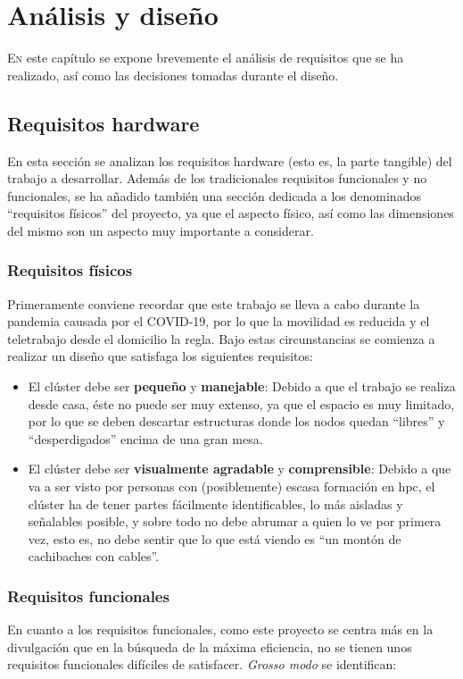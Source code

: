 \chapter{Análisis y diseño}
\label{chap:analisis_diseño}

\lettrine{E}{n} este capítulo se expone brevemente el análisis de requisitos que se ha realizado, así como las decisiones tomadas durante el diseño.

\section{Requisitos hardware}
\label{sec:requisitos_hardware}
En esta sección se analizan los requisitos hardware (esto es, la parte tangible) del trabajo a desarrollar. Además de los tradicionales requisitos funcionales y no funcionales, se ha añadido también una sección dedicada a los denominados ``requisitos físicos'' del proyecto, ya que el aspecto físico, así como las dimensiones del mismo son un aspecto muy importante a considerar.

\subsection{Requisitos físicos}
Primeramente conviene recordar que este trabajo se lleva a cabo durante la pandemia causada por el COVID-19, por lo que la movilidad es reducida y el teletrabajo desde el domicilio la regla. Bajo estas circunstancias se comienza a realizar un diseño que satisfaga los siguientes requisitos:
\begin{itemize}
    \item El clúster debe ser \textbf{pequeño} y \textbf{manejable}: Debido a que el trabajo se realiza desde casa, éste no puede ser muy extenso, ya que el espacio es muy limitado, por lo que se deben descartar estructuras donde los nodos quedan ``libres'' y ``desperdigados'' encima de una gran mesa.
    \item El clúster debe ser \textbf{visualmente agradable} y \textbf{comprensible}: Debido a que va a ser visto por personas con (posiblemente) escasa formación en \acrshort{hpc}, el clúster ha de tener partes fácilmente identificables, lo más aisladas y señalables posible, y sobre todo no debe abrumar a quien lo ve por primera vez, esto es, no debe sentir que lo que está viendo es ``un montón de cachibaches con cables''.
\end{itemize}

\subsection{Requisitos funcionales}
En cuanto a los requisitos funcionales, como este proyecto se centra más en la divulgación que en la búsqueda de la máxima eficiencia, no se tienen unos requisitos funcionales difíciles de satisfacer. \textit{Grosso modo} se identifican:

